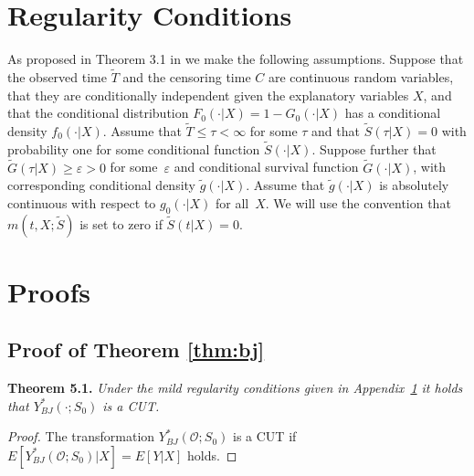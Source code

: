 \documentclass[12pt, a4paper]{scrartcl}
\theoremstyle{definition}
\theoremstyle{plain}
\numberwithin{equation}{section}
\numberwithin{figure}{section}
\numberwithin{table}{section}
\begin{document}
	\newpage
	
	\begin{appendices}
		\section{Regularity Conditions}\label{regcond}
		As proposed in Theorem 3.1 in \citet*{drcut} we make the following assumptions.
		Suppose that the observed time $\tilde T$ and the censoring time $C$ are continuous random variables, that they are conditionally independent given the explanatory variables $X$, and that the conditional distribution $F_0(\cdot \vert X) = 1 - G_0(\cdot \vert X)$ has a conditional density $f_0(\cdot \vert X)$.
		Assume that $\tilde T \leq \tau < \infty$ for some $\tau$ and that $\tilde{S}(\tau \vert X)=0$ with probability one for some conditional function $\tilde{S}(\cdot \vert X)$.
		Suppose further that $\tilde{G}(\tau \vert X)\geq \varepsilon > 0$ for some~$\varepsilon$ and conditional survival function $\tilde{G}(\cdot \vert X)$, with corresponding conditional density $\tilde{g}(\cdot\vert X)$.
		Assume that $\tilde{g}(\cdot\vert X)$ is absolutely continuous with respect to $g_0(\cdot\vert X)$ for all~$X$.
		We will use the convention that $m(t,X;\tilde{S})$ is set to zero if $\tilde{S}(t \vert X)=0$.
		\section{Proofs}
		\subsection{Proof of Theorem \ref{thm:bj}}\label{proof:bjcut}
		\textbf{Theorem {5.1.}} \textit{Under the mild regularity conditions given in Appendix~\ref{regcond} it holds that $Y_{BJ}^*(\cdot; S_0)$ is a CUT.}
		\begin{proof}
			The transformation $Y_{BJ}^*(\mathcal{O}; S_0)$ is a CUT if $E[Y_{BJ}^*(\mathcal{O}; S_0)\vert X] = E[Y\vert X]$ holds.
			

\end{proof}
\end{appendices}
\end{document}
